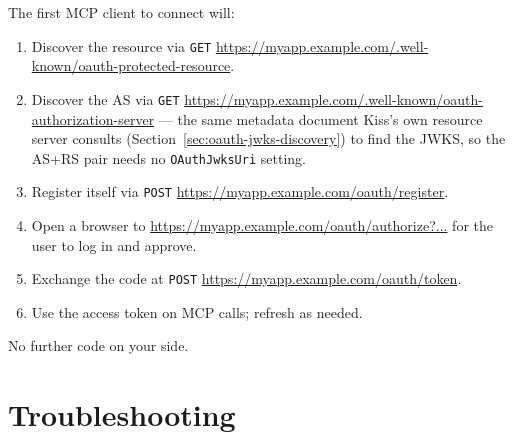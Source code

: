 \noindent
The first MCP client to connect will:

\begin{enumerate}
  \item Discover the resource via \texttt{GET} \url{https://myapp.example.com/.well-known/oauth-protected-resource}.
  \item Discover the AS via \texttt{GET} \url{https://myapp.example.com/.well-known/oauth-authorization-server} --- the same metadata document Kiss's own resource server consults (Section~\ref{sec:oauth-jwks-discovery}) to find the JWKS, so the AS+RS pair needs no \texttt{OAuthJwksUri} setting.
  \item Register itself via \texttt{POST} \url{https://myapp.example.com/oauth/register}.
  \item Open a browser to \url{https://myapp.example.com/oauth/authorize?...} for the user to log in and approve.
  \item Exchange the code at \texttt{POST} \url{https://myapp.example.com/oauth/token}.
  \item Use the access token on MCP calls; refresh as needed.
\end{enumerate}

\noindent
No further code on your side.

\section{Troubleshooting}
\label{sec:as-troubleshooting}

